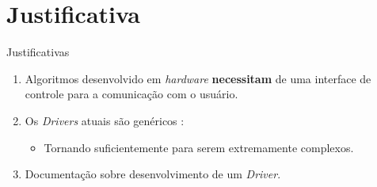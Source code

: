 \section{Justificativa}
	\begin{frame}{Justificativas}
		\begin{enumerate}
			\setlength\itemsep{1.5em}
			\item Algoritmos desenvolvido em \textit{hardware} \textbf{necessitam} de uma interface de controle para a comunicação com o usuário.
			\item Os \textit{Drivers} atuais são genéricos \cite{corbet2005linux}:
			\begin{itemize}
				\item Tornando suficientemente para serem extremamente complexos.
			\end{itemize}
			\item Documentação sobre desenvolvimento de um \textit{Driver}.
		\end{enumerate}
	\end{frame}
